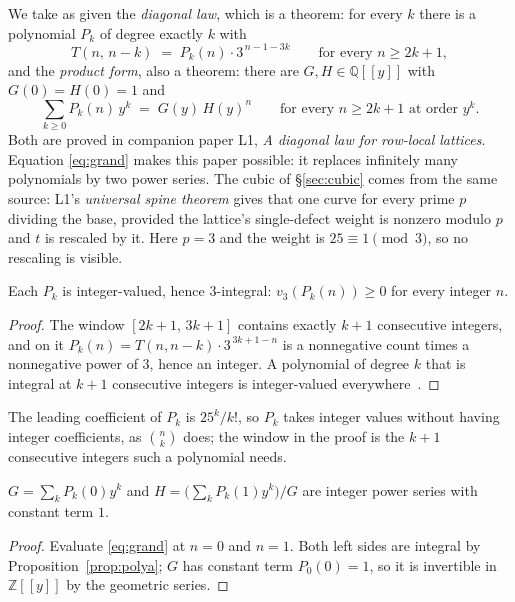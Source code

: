 \documentclass[11pt]{article}
\newcommand{\Z}{\mathbb{Z}}
\newcommand{\Q}{\mathbb{Q}}
\newcommand{\vthree}{v_3}
\begin{document}
We take as given the \emph{diagonal law}, which is a theorem: for every $k$
there is a polynomial $P_k$ of degree exactly $k$ with
\begin{equation}
  T(n,\,n-k) \;=\; P_k(n)\cdot 3^{\,n-1-3k}
  \qquad\text{for every } n \ge 2k+1,
  \label{eq:law}
\end{equation}
and the \emph{product form}, also a theorem: there are $G, H \in \Q[[y]]$ with
$G(0) = H(0) = 1$ and
\begin{equation}
  \sum_{k \ge 0} P_k(n)\,y^k \;=\; G(y)\,H(y)^n
  \qquad\text{for every } n \ge 2k+1 \text{ at order } y^k .
  \label{eq:grand}
\end{equation}
Both are proved in companion paper L1, \emph{A diagonal law for row-local
lattices}. Equation \eqref{eq:grand} makes this paper possible: it
replaces infinitely many polynomials by two power series. The cubic of
\S\ref{sec:cubic} comes from the same source: L1's \emph{universal spine
theorem} gives that one curve for every prime $p$ dividing the base, provided
the lattice's single-defect weight is nonzero modulo $p$ and $t$ is rescaled by
it. Here $p = 3$ and the weight is $25 \equiv 1 \pmod 3$, so no rescaling is
visible.

\begin{proposition}
\label{prop:polya}
Each $P_k$ is integer-valued, hence $3$-integral: $\vthree(P_k(n)) \ge 0$ for
every integer $n$.
\end{proposition}

\begin{proof}
The window $[2k+1,\,3k+1]$ contains exactly $k+1$ consecutive integers, and on
it $P_k(n) = T(n,n-k)\cdot 3^{\,3k+1-n}$ is a nonnegative count times a
nonnegative power of $3$, hence an integer. A polynomial of degree $k$ that is
integral at $k+1$ consecutive integers is integer-valued
everywhere~\cite{polya1915}.
\end{proof}

The leading coefficient of $P_k$ is $25^k/k!$, so $P_k$ takes integer values
without having integer coefficients, as $\binom{n}{k}$ does; the window in the
proof is the $k+1$ consecutive integers such a polynomial needs.

\begin{proposition}
\label{prop:GH}
$G = \sum_k P_k(0)y^k$ and $H = \bigl(\sum_k P_k(1)y^k\bigr)/G$ are integer power
series with constant term $1$.
\end{proposition}

\begin{proof}
Evaluate \eqref{eq:grand} at $n = 0$ and $n = 1$. Both left sides are integral
by Proposition~\ref{prop:polya}; $G$ has constant term $P_0(0) = 1$, so it is
invertible in $\Z[[y]]$ by the geometric series.
\end{proof}
\end{document}
